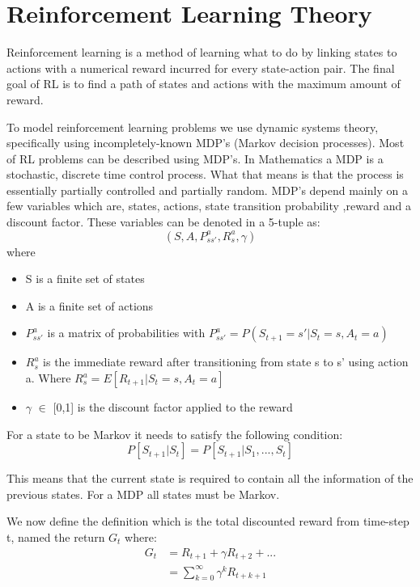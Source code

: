\graphicspath{{RL\_theory/fig}}

\chapter{Reinforcement Learning Theory}
\label{chap:RL_theory}

Reinforcement learning is a method of learning what to do by linking states to actions with a numerical reward incurred for every state-action pair. The final goal of RL is to find a path of states and actions with the maximum amount of reward. \cite{sutton_barto}

To model reinforcement learning problems we use dynamic systems theory, specifically using incompletely-known MDP's (Markov decision
processes). Most of RL problems can be described using MDP's. In Mathematics a MDP is a stochastic, discrete time control process. What that means is that the process is essentially partially controlled and partially random. MDP's depend mainly on a few variables which are, states, actions, state transition probability ,reward and a discount factor. These variables can be denoted in a 5-tuple as:
\[(S,A,P^{a}_{ss'},R^{a}_{s},\gamma)\] where
\begin{itemize}
	\item S is a finite set of states
	\item A is a finite set of actions
	\item $P^{a}_{ss'}$ is a matrix of probabilities with $P^{a}_{ss'} = P(S_{t+1} = s' | S_t = s,A_t = a) $
	\item $R^{a}_{s}$ is the immediate reward after transitioning from state s to s' using action a. Where $R^{a}_{s} = E[R_{t+1}|S_t =s, A_t =a]$
	\item $\gamma$ $\in$ [0,1] is the discount factor applied to the reward
\end{itemize}

For a state to be Markov it needs to satisfy the following condition:
\[P[S_{t+1}|S_{t}] = P[S_{t+1}|S_{1},...,S_{t}]\]

This means that the current state is required to contain all the information of the previous states. For a MDP all states must be Markov.

We now define the definition which is the total discounted reward from time-step t, named the return $G_t$ where:
\begin{align}
	G_t &= R_{t+1}+\gamma R_{t+2} + ... \\
		&= \sum_{k=0}^{\infty}\gamma^{k} R_{t+k+1}
\end{align}

